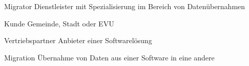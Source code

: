 \begin{glossar}[Vertriebspartner] %
    \item[Migrator]         Dienstleister mit Spezialisierung im Bereich von Datenübernahmen 
    \item[Kunde]            Gemeinde, Stadt oder EVU
    \item[Vertriebspartner] Anbieter einer Softwarelösung
    \item[Migration]        Übernahme von Daten aus einer Software in eine andere
\end{glossar}
